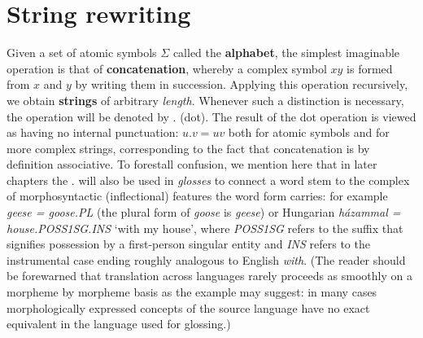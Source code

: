 \section{String rewriting}

Given a set of atomic symbols $\Sigma$ called the {\bf alphabet}, the simplest
imaginable operation is that of {\bf concatenation}, whereby a complex symbol
$xy$ is formed from $x$ and $y$ by writing them in succession.  Applying this
operation recursively, we obtain {\bf strings} of arbitrary {\it length}.
Whenever such a distinction is necessary, the operation will be denoted by .
(dot). The result of the dot operation is viewed as having no internal
punctuation: $u . v = uv$ both for atomic symbols and for more complex
strings, corresponding to the fact that concatenation is by definition
associative. To forestall confusion, we mention here that in later chapters the
. will also be used in {\it glosses} to connect a word stem to the complex of
morphosyntactic (inflectional) features the word form carries: for example
{\it geese = goose.PL} (the plural form of {\it goose} is {\it geese}) or
Hungarian {\it h\'azammal = house.POSS1SG.INS} `with my house', where {\it
POSS1SG} refers to the suffix that signifies possession by a first-person
singular entity and {\it INS} refers to the instrumental case ending roughly
analogous to English {\it with}. (The reader should be forewarned
that translation across languages rarely proceeds as smoothly on a morpheme by
morpheme basis as the example may suggest: in many cases morphologically
expressed concepts of the source language have no exact equivalent in the
language used for glossing.)

